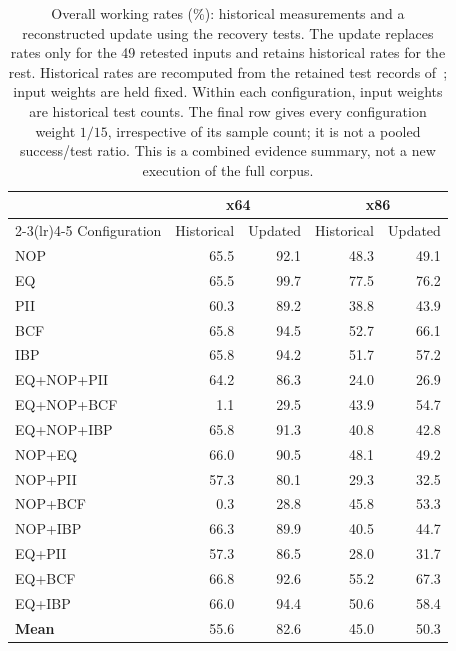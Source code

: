 \begin{table}[t]
\caption{Overall working rates (\%): historical measurements and a
reconstructed update using the recovery tests. The update replaces rates
only for the 49 retested inputs and retains historical rates for the rest.
Historical rates are recomputed from the retained test records of~\cite{zone_secrypt_2026}; input weights are held fixed. Within each configuration, input weights are historical test counts.
The final row gives every configuration weight $1/15$, irrespective of
its sample count; it is not a pooled success/test ratio.
This is a combined evidence summary, not a new execution of the full corpus.}
\label{tab:overall_working_update}
\centering\small\setlength{\tabcolsep}{5pt}
\begin{tabular}{@{}lrrrr@{}}
\toprule
 & \multicolumn{2}{c}{x64} & \multicolumn{2}{c}{x86} \\
\cmidrule(lr){2-3}\cmidrule(lr){4-5}
Configuration & Historical & Updated & Historical & Updated \\
\midrule
NOP & 65.5 & 92.1 & 48.3 & 49.1 \\
EQ & 65.5 & 99.7 & 77.5 & 76.2 \\
PII & 60.3 & 89.2 & 38.8 & 43.9 \\
BCF & 65.8 & 94.5 & 52.7 & 66.1 \\
IBP & 65.8 & 94.2 & 51.7 & 57.2 \\
EQ+NOP+PII & 64.2 & 86.3 & 24.0 & 26.9 \\
EQ+NOP+BCF & 1.1 & 29.5 & 43.9 & 54.7 \\
EQ+NOP+IBP & 65.8 & 91.3 & 40.8 & 42.8 \\
NOP+EQ & 66.0 & 90.5 & 48.1 & 49.2 \\
NOP+PII & 57.3 & 80.1 & 29.3 & 32.5 \\
NOP+BCF & 0.3 & 28.8 & 45.8 & 53.3 \\
NOP+IBP & 66.3 & 89.9 & 40.5 & 44.7 \\
EQ+PII & 57.3 & 86.5 & 28.0 & 31.7 \\
EQ+BCF & 66.8 & 92.6 & 55.2 & 67.3 \\
EQ+IBP & 66.0 & 94.4 & 50.6 & 58.4 \\
\midrule
\textbf{Mean} & 55.6 & 82.6 & 45.0 & 50.3 \\
\bottomrule
\end{tabular}
\end{table}
